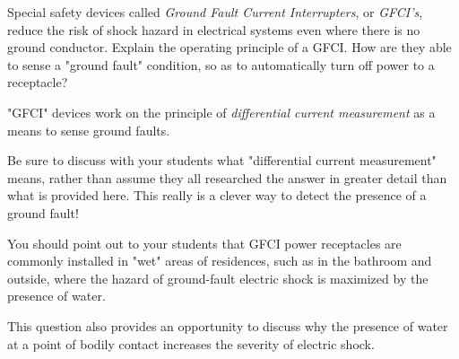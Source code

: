 

Special safety devices called {\it Ground Fault Current Interrupters}, or {\it GFCI's}, reduce the risk of shock hazard in electrical systems even where there is no ground conductor.  Explain the operating principle of a GFCI.  How are they able to sense a "ground fault" condition, so as to automatically turn off power to a receptacle?







"GFCI" devices work on the principle of {\it differential current measurement} as a means to sense ground faults.







Be sure to discuss with your students what "differential current measurement" means, rather than assume they all researched the answer in greater detail than what is provided here.  This really is a clever way to detect the presence of a ground fault!

You should point out to your students that GFCI power receptacles are commonly installed in "wet" areas of residences, such as in the bathroom and outside, where the hazard of ground-fault electric shock is maximized by the presence of water.

This question also provides an opportunity to discuss why the presence of water at a point of bodily contact increases the severity of electric shock.




